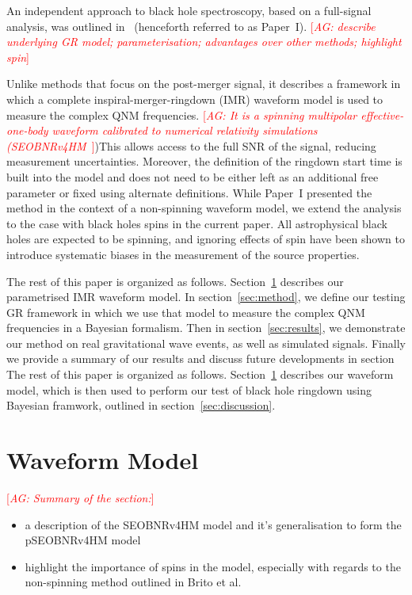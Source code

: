 \documentclass[twocolumn,prd,superscriptaddress,amsfonts,amssymb,amsmath,preprintnumbers]{revtex4-1}
\newcommand{\paperone}{Paper~I\xspace}
\newcommand{\abhi}[1]{\textcolor{red}{[\textit{AG: #1}]}}
\begin{document}
\par
An independent approach to black hole spectroscopy, based on a full-signal analysis, was outlined in~\citep{Brito:2018rfr} (henceforth referred to as \paperone). \abhi{describe underlying GR model; parameterisation; advantages over other methods; highlight spin} 



Unlike methods that focus on the post-merger signal, it describes a framework in which a complete inspiral-merger-ringdown (IMR) waveform model is used to measure the complex QNM frequencies. \abhi{It is a spinning multipolar effective-one-body waveform calibrated to numerical relativity simulations (SEOBNRv4HM~\citep{Cotesta:2018fcv}})This allows access to the full SNR of the signal, reducing measurement uncertainties. Moreover, the definition of the ringdown start time is built into the model and does not need to be either left as an additional free parameter or fixed using alternate definitions. While \paperone presented the method in the context of a non-spinning waveform model, we extend the analysis to the case with black holes spins in the current paper. All astrophysical black holes are expected to be spinning, and ignoring effects of spin have been shown to introduce systematic biases in the measurement of the source properties.
\par
The rest of this paper is organized as follows. Section~\ref{sec:model} describes our parametrised IMR waveform model. In section~\ref{sec:method}, we define our testing GR framework in which we use that model to measure the complex QNM frequencies in a Bayesian formalism. Then in section~\ref{sec:results}, we demonstrate our method on real gravitational wave events, as well as simulated signals. Finally we provide a summary of our results and discuss future developments in section  The rest of this paper is organized as follows. Section~\ref{sec:model} describes our waveform model, which is then used to perform our test of black hole ringdown using Bayesian framwork, outlined in section~\ref{sec:discussion}.

\section{Waveform Model}\label{sec:model}

\abhi{Summary of the section:}

\begin{itemize}
\item{a description of the SEOBNRv4HM model and it's generalisation to form the pSEOBNRv4HM model}
\item{highlight the importance of spins in the model, especially with regards to the non-spinning method outlined in Brito et al.}
\end{itemize}
\end{document}
